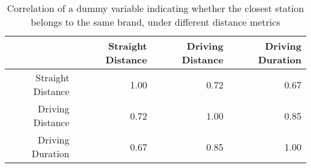 \begin{table}[ht]
\centering
\begin{tabular}{rrrr}
  \hline
 & Straight Distance & Driving Distance & Driving Duration \\ 
  \hline
Straight Distance & 1.00 & 0.72 & 0.67 \\ 
  Driving Distance & 0.72 & 1.00 & 0.85 \\ 
  Driving Duration & 0.67 & 0.85 & 1.00 \\ 
   \hline
\end{tabular}
\caption{Correlation of a dummy variable indicating whether the closest station belongs to the same brand, under different distance metrics} 
\end{table}
